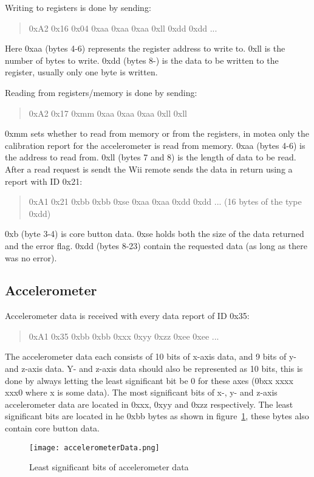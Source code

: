 Writing to registers is done by sending:
\begin{quote}
0xA2 0x16 0x04 0xaa 0xaa 0xaa 0xll 0xdd 0xdd ...
\end{quote}
Here 0xaa (bytes 4-6) represents the register address to write to. 0xll is the number of bytes to write. 0xdd (bytes 8-) is the data to be written to the register, usually only one byte is written.

Reading from registers/memory is done by sending:
\begin{quote}
0xA2 0x17 0xmm 0xaa 0xaa 0xaa 0xll 0xll
\end{quote}
0xmm sets whether to read from memory or from the registers, in motea only the calibration report for the accelerometer is read from memory. 0xaa (bytes 4-6) is the address to read from. 0xll (bytes 7 and 8) is the length of data to be read. After a read request is sendt the Wii remote sends the data in return using a report with ID 0x21:
\begin{quote}
0xA1 0x21 0xbb 0xbb 0xse 0xaa 0xaa 0xdd 0xdd ... (16 bytes of the type 0xdd)
\end{quote}
0xb (byte 3-4) is core button data. 0xse holds both the size of the data returned and the error flag. 0xdd (bytes 8-23) contain the requested data (as long as there was no error).

\subsection{Accelerometer}
Accelerometer data is received with every data report of ID 0x35:
\begin{quote}
0xA1 0x35 0xbb 0xbb 0xxx 0xyy 0xzz 0xee 0xee ...
\end{quote}
The accelerometer data each consists of 10 bits of x-axis data, and 9 bits of y- and z-axis data. Y- and z-axis data should also be represented as 10 bits, this is done by always letting the least significant bit be 0 for these axes (0bxx xxxx xxx0 where x is some data). The most significant bits of x-, y- and z-axis accelerometer data are located in 0xxx, 0xyy and 0xzz respectively. The least significant bits are located in he 0xbb bytes as shown in figure~\ref{fig:accelerometerData}, these bytes also contain core button data.
\begin{figure}[h!]
\texttt{[image: accelerometerData.png]}
\caption{\footnotesize Least significant bits of accelerometer data}
\label{fig:accelerometerData}
\end{figure}

